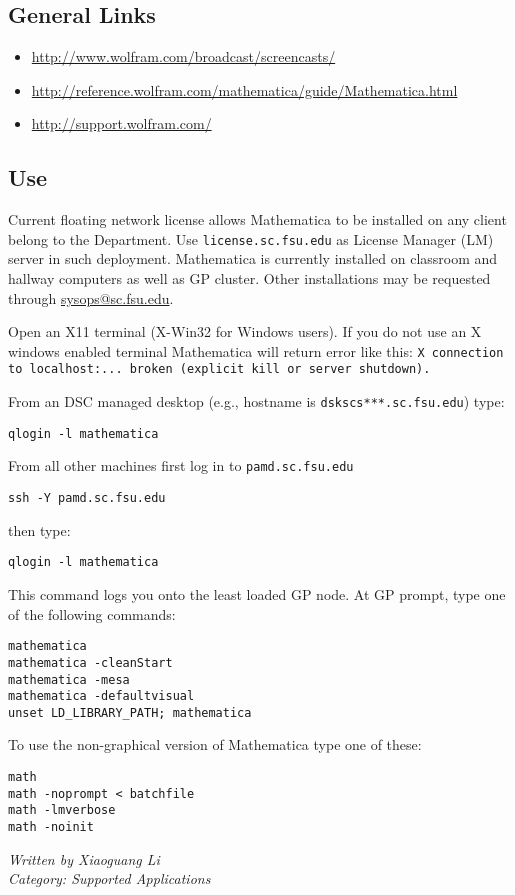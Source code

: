 \documentclass[12pt,a4paper]{article}
\begin{document}
\subsection*{General Links}
\begin{itemize}
    \item \url{http://www.wolfram.com/broadcast/screencasts/}
    \item \url{http://reference.wolfram.com/mathematica/guide/Mathematica.html}
    \item \url{http://support.wolfram.com/}
\end{itemize}

\subsection*{Use}
Current floating network license allows Mathematica to be installed on any client belong to the Department. Use \texttt{license.sc.fsu.edu} as License Manager (LM) server in such deployment. Mathematica is currently installed on classroom and hallway computers as well as GP cluster. Other installations may be requested through \href{mailto:sysops@sc.fsu.edu}{sysops@sc.fsu.edu}.

Open an X11 terminal (X-Win32 for Windows users). If you do not use an X windows enabled terminal Mathematica will return error like this:
\texttt{X connection to localhost:... broken (explicit kill or server shutdown).}

From an DSC managed desktop (e.g., hostname is \texttt{dskscs***.sc.fsu.edu}) type:
\begin{verbatim}
qlogin -l mathematica
\end{verbatim}
From all other machines first log in to \texttt{pamd.sc.fsu.edu}
\begin{verbatim}
ssh -Y pamd.sc.fsu.edu
\end{verbatim}
then type:
\begin{verbatim}
qlogin -l mathematica
\end{verbatim}
This command logs you onto the least loaded GP node. At GP prompt, type one of the following commands:
\begin{verbatim}
mathematica
mathematica -cleanStart
mathematica -mesa
mathematica -defaultvisual
unset LD_LIBRARY_PATH; mathematica
\end{verbatim}
To use the non-graphical version of Mathematica type one of these:
\begin{verbatim}
math
math -noprompt < batchfile
math -lmverbose
math -noinit
\end{verbatim}
\hfill \textit{Written by Xiaoguang Li} \\
\hfill \textit{Category: Supported Applications}
\end{document}
